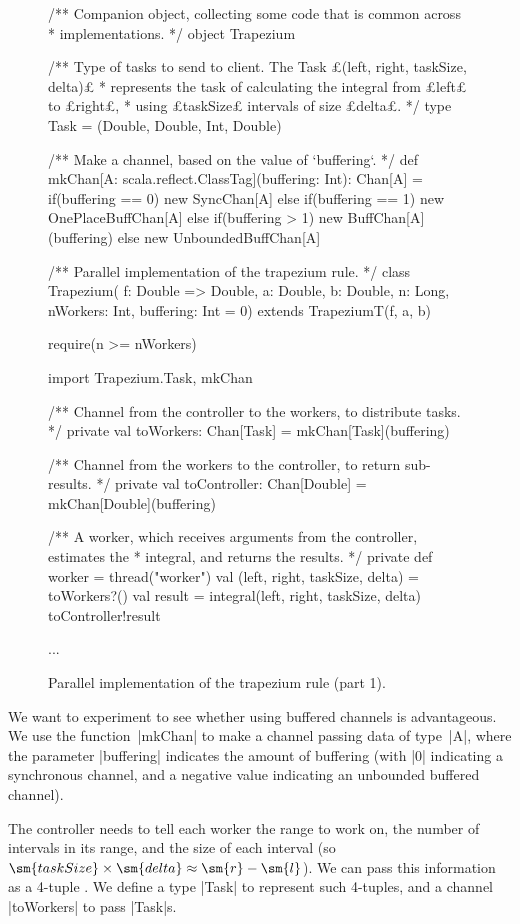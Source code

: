 \begin{figure}
\begin{scala}
/** Companion object, collecting some code that is common across 
  * implementations. */
object Trapezium{
  /** Type of tasks to send to client.  The Task £(left, right, taskSize, delta)£
    * represents the task of calculating the integral from £left£ to £right£,
    * using £taskSize£ intervals of size £delta£. */
  type Task = (Double, Double, Int, Double)

  /** Make a channel, based on the value of `buffering`. */
  def mkChan[A: scala.reflect.ClassTag](buffering: Int): Chan[A] = 
    if(buffering == 0) new SyncChan[A] 
    else if(buffering == 1) new OnePlaceBuffChan[A]
    else if(buffering > 1) new BuffChan[A](buffering) 
    else new UnboundedBuffChan[A]
}

/** Parallel implementation of the trapezium rule. */
class Trapezium(
  f: Double => Double, a: Double, b: Double, n: Long, nWorkers: Int, buffering: Int = 0)
    extends TrapeziumT(f, a, b){
  require(n >= nWorkers)

  import Trapezium.{Task, mkChan}

  /** Channel from the controller to the workers, to distribute tasks. */
  private val toWorkers: Chan[Task] = mkChan[Task](buffering)

  /** Channel from the workers to the controller, to return sub-results. */
  private val toController: Chan[Double] = mkChan[Double](buffering)

  /** A worker, which receives arguments from the controller, estimates the
    * integral, and returns the results. */
  private def worker = thread("worker"){
    val (left, right, taskSize, delta) = toWorkers?()
    val result = integral(left, right, taskSize, delta)
    toController!result
  }

  ...
}
\end{scala}
\caption{Parallel implementation of the trapezium rule (part 1).}
\label{fig:trapezium-1}
\end{figure}


We want to experiment to see whether using buffered channels is advantageous.
We use the function~|mkChan| to make a channel passing data of type~|A|, where
the parameter |buffering| indicates the amount of buffering (with |0|
indicating a synchronous channel, and a negative value indicating an unbounded
buffered channel).

The controller needs to tell each worker the range \SCALA{[l,r]} to work on,
the number  of intervals in its range, and the size
 of each interval (so $\sm{taskSize} \times \sm{delta} \approx
\sm{r} - \sm{l}$).  We can pass this information as a 4-tuple .  We define a type |Task| to represent such 4-tuples, and
a channel |toWorkers| to pass |Task|s.

